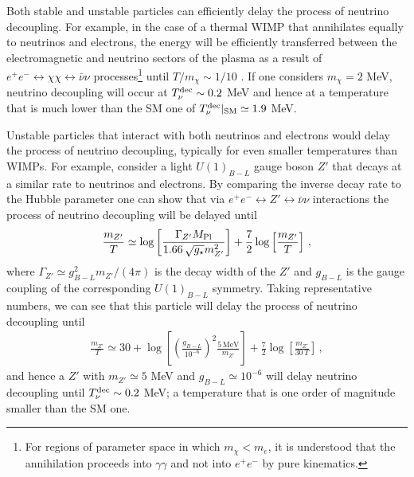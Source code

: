 \documentclass[notitlepage,letterpaper,natbib,aps,prd,onecolumn,amsmath,amsfonts,nofootinbib,preprintnumbers,superscriptaddress,secnumarabic,groupedaddress]{revtex4-1}
\begin{document}
Both stable and unstable particles can efficiently delay the process of neutrino decoupling. For example, in the case of a thermal WIMP that annihilates equally to neutrinos and electrons, the energy will be efficiently transferred between the electromagnetic and neutrino sectors of the plasma as a result of $e^+e^- \leftrightarrow \chi \chi  \leftrightarrow \bar{\nu} \nu$ processes\footnote{For regions of parameter space in which $m_\chi<m_e$, it is understood that the annihilation proceeds into $\gamma \gamma$ and not into $e^+e^-$ by pure kinematics.} until $T/m_\chi \sim 1/10$ \cite{Escudero:2018mvt}. If one considers $m_\chi = 2$ MeV, neutrino decoupling will occur at $T_{\nu}^{\rm dec} \sim 0.2$ MeV and hence at a temperature that is much lower than the SM one of $T_{\nu} ^{\rm dec}|_{\rm SM} \simeq 1.9$ MeV.

Unstable particles that interact with both neutrinos and electrons would delay the process of neutrino decoupling, typically for even smaller temperatures than WIMPs. For example, consider a light $U(1)_{B-L}$ gauge boson $Z'$ that decays at a similar rate to neutrinos and electrons. By comparing the inverse decay rate to the Hubble parameter one can show that via $e^+e^- \leftrightarrow Z' \leftrightarrow \bar{\nu}\nu$ interactions the process of neutrino decoupling will be delayed until
\begin{align}\label{eq:dec_invdecay}
\frac{m_{Z'}}{T} \simeq \log\left[\frac{ \Gamma_{Z'} M_{\rm Pl}}{1.66\,\sqrt{g_\star} m_{Z'}^2}\right] + \frac{7}{2} \log\left[\frac{m_{Z'}}{T}\right]\, ,
\end{align}
where $\Gamma_{Z'} \simeq g_{B-L}^2 m_{Z'}/(4\pi)$ is the decay width of the $Z'$ and $g_{B-L}$ is the gauge coupling of the corresponding $U(1)_{B-L}$ symmetry. Taking representative numbers, we can see that this particle will delay the process of neutrino decoupling until
\begin{align}\label{eq:nudec_decay}
\frac{m_{Z'}}{T} \simeq 30 + \log\left[ \left(\frac{g_{B-L}}{10^{-6}}\right)^2 \frac{5\,\text{MeV}}{m_{Z'}}\right] + \frac{7}{2} \log\left[\frac{m_{Z'}}{30\,T}\right]\, ,
\end{align}
and hence a $Z'$ with $m_{Z'} \simeq 5$ MeV and $g_{B-L} \simeq 10^{-6}$ will delay neutrino decoupling until $T_{\nu}^{\rm dec} \sim 0.2$ MeV; a temperature that is one order of magnitude smaller than the SM one.
\end{document}
